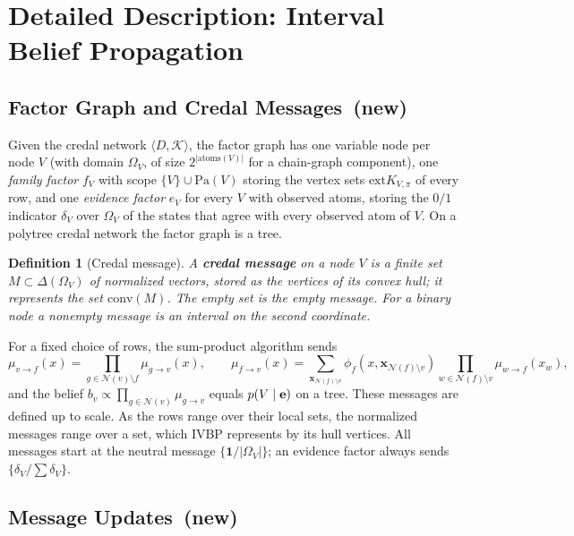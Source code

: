 \documentclass{article} %
\DeclareRobustCommand{\rev}[1]{{\color{blue}#1}}
\newcommand{\newtag}{\texorpdfstring{~\rev{(new)}}{}}
\newtheorem{definition}{Definition}
\newcommand{\ext}{\mathrm{ext}}
\providecommand{\Pa}{\mathrm{Pa}}
\begin{document}
\section{Detailed Description: Interval Belief Propagation}
\label{sec-full-ibp}

\subsection{Factor Graph and Credal Messages\newtag}

Given the credal network $\langle D,\mathcal K\rangle$, the factor graph has one
variable node per node $V$ (with domain $\Omega_V$, of size $2^{|\mathrm{atoms}(V)|}$
for a chain-graph component), one \emph{family factor} $f_V$ with scope
$\{V\}\cup\Pa(V)$ storing the vertex sets $\ext K_{V,\pi}$ of every row, and
one \emph{evidence factor} $e_V$ for every $V$ with observed atoms, storing the
$0/1$ indicator $\delta_V$ over $\Omega_V$ of the states that agree with every observed
atom of $V$. On a polytree credal network the factor graph is a tree.

\begin{definition}[Credal message]
A \textbf{credal message} on a node $V$ is a finite set
$M\subset\Delta(\Omega_V)$ of normalized vectors, stored as the vertices of its convex
hull; it represents the set $\mathrm{conv}(M)$. The empty set is the \emph{empty message}.
For a binary node a nonempty message is an interval on the second coordinate.
\end{definition}

For a fixed choice of rows, the sum-product algorithm \citep{kschischang2001factor} sends
\begin{equation}\label{eq:sum-product}
  \mu_{v\to f}(x)=\prod_{g\in\mathcal N(v)\setminus f}\mu_{g\to v}(x),\qquad
  \mu_{f\to v}(x)=\sum_{\mathbf x_{\mathcal N(f)\setminus v}}\phi_f(x,\mathbf x_{\mathcal N(f)\setminus v})\prod_{w\in\mathcal N(f)\setminus v}\mu_{w\to f}(x_w),
\end{equation}
and the belief $b_v\propto\prod_{g\in\mathcal N(v)}\mu_{g\to v}$ equals $p(V\mid\mathbf{e})$ on a tree. These messages are defined up to scale. As the rows range
over their local sets, the normalized messages range over a set, which IVBP
represents by its hull vertices. All messages start at the neutral message
$\{\mathbf 1/|\Omega_V|\}$; an evidence factor always sends $\{\delta_V/\sum\delta_V\}$.

\subsection{Message Updates\newtag}\label{sec:ibp-updates}
\end{document}
